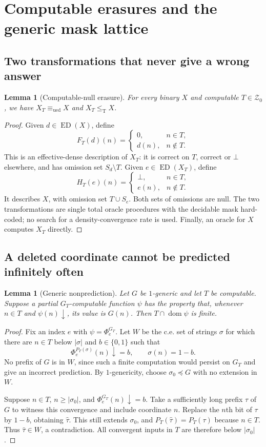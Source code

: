 \documentclass[11pt,a4paper]{article}
\newcommand{\leT}{\leq_{\mathrm T}}
\newcommand{\ued}{\mathrm{ued}}
\newcommand{\eqU}{\equiv_{\ued}}
\newcommand{\ED}{\operatorname{ED}}
\newcommand{\Znull}{\mathcal Z_0}
\newcommand{\prefix}{\preccurlyeq}
\newtheorem{lemma}[theorem]{Lemma}
\theoremstyle{definition}
\theoremstyle{remark}
\DeclareMathOperator{\dom}{dom}
\begin{document}
\section{Computable erasures and the generic mask lattice}
\label{cr14:sec:erasures}
\subsection{Two transformations that never give a wrong answer}
\begin{lemma}[Computable-null erasure]\label{cr14:lem:equivalence}
For every binary $X$ and computable $T\in\Znull$, we have
$X_T\eqU X$ and $X_T\leT X$.
\end{lemma}
\begin{proof}
Given $d\in\ED(X)$, define
\[
 F_T(d)(n)=\begin{cases}0,&n\in T,\\d(n),&n\notin T.\end{cases}
\]
This is an effective-dense description of $X_T$: it is correct on $T$,
correct or $\bot$ elsewhere, and has omission set $S_d\setminus T$.
Given $e\in\ED(X_T)$, define
\[
 H_T(e)(n)=\begin{cases}\bot,&n\in T,\\e(n),&n\notin T.\end{cases}
\]
It describes $X$, with omission set $T\cup S_e$. Both sets of omissions
are null. The two transformations are single total oracle procedures with
the decidable mask hard-coded; no search for a density-convergence rate is
used. Finally, an oracle for $X$ computes $X_T$ directly.
\end{proof}

\subsection{A deleted coordinate cannot be predicted infinitely often}
\begin{lemma}[Generic nonprediction]\label{cr14:lem:prediction}
Let $G$ be $1$-generic and let $T$ be computable. Suppose a partial
$G_T$-computable function $\psi$ has the property that, whenever
$n\in T$ and $\psi(n)\downarrow$, its value is $G(n)$.
Then $T\cap\dom\psi$ is finite.
\end{lemma}
\begin{proof}
Fix an index $e$ with $\psi=\Phi_e^{G_T}$. Let $W$ be the c.e. set of
strings $\sigma$ for which there are $n\in T$ below $|\sigma|$ and
$b\in\{0,1\}$ such that
\[
 \Phi_e^{P_T(\sigma)}(n)\downarrow=b,
 \qquad \sigma(n)=1-b.
\]
No prefix of $G$ is in $W$, since such a finite computation would persist
on $G_T$ and give an incorrect prediction. By $1$-genericity, choose
$\sigma_0\prefix G$ with no extension in $W$.

Suppose $n\in T$, $n\geq|\sigma_0|$, and
$\Phi_e^{G_T}(n)\downarrow=b$. Take a sufficiently long prefix $\tau$ of
$G$ to witness this convergence and include coordinate $n$. Replace the
$n$th bit of $\tau$ by $1-b$, obtaining $\widehat\tau$. This still extends
$\sigma_0$, and
$P_T(\widehat\tau)=P_T(\tau)$ because $n\in T$. Thus
$\widehat\tau\in W$, a contradiction. All convergent inputs in $T$ are
therefore below $|\sigma_0|$.
\end{proof}
\end{document}
